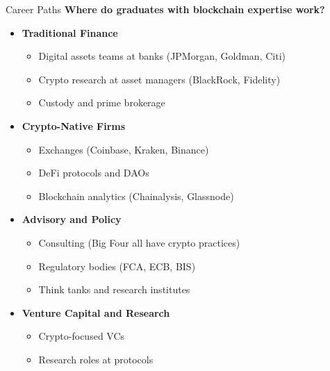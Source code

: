 \documentclass[10pt]{beamer}
\begin{document}
\begin{frame}{Career Paths}
  \textbf{Where do graduates with blockchain expertise work?}
  
  \vspace{0.5em}
  \begin{itemize}
    \item \textbf{Traditional Finance}
    \begin{itemize}
      \item Digital assets teams at banks (JPMorgan, Goldman, Citi)
      \item Crypto research at asset managers (BlackRock, Fidelity)
      \item Custody and prime brokerage
    \end{itemize}
    
    \vspace{0.3em}
    \item \textbf{Crypto-Native Firms}
    \begin{itemize}
      \item Exchanges (Coinbase, Kraken, Binance)
      \item DeFi protocols and DAOs
      \item Blockchain analytics (Chainalysis, Glassnode)
    \end{itemize}
    
    \vspace{0.3em}
    \item \textbf{Advisory and Policy}
    \begin{itemize}
      \item Consulting (Big Four all have crypto practices)
      \item Regulatory bodies (FCA, ECB, BIS)
      \item Think tanks and research institutes
    \end{itemize}
    
    \vspace{0.3em}
    \item \textbf{Venture Capital and Research}
    \begin{itemize}
      \item Crypto-focused VCs
      \item Research roles at protocols
    \end{itemize}
  \end{itemize}
\end{frame}

\end{document}
